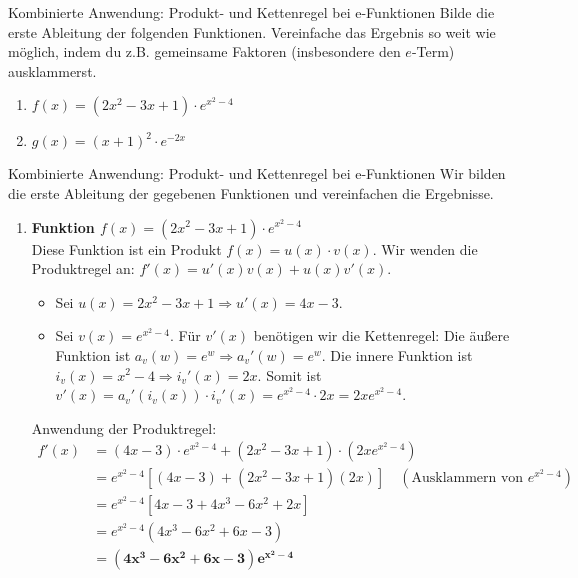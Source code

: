 \begin{aufgabenumgebung}{Kombinierte Anwendung: Produkt- und Kettenregel bei e-Funktionen}
Bilde die erste Ableitung der folgenden Funktionen. Vereinfache das Ergebnis so weit wie möglich, indem du z.B. gemeinsame Faktoren (insbesondere den $e$-Term) ausklammerst.
\begin{enumerate}
    \item $f(x) = (2x^2 - 3x + 1) \cdot e^{x^2 - 4}$
    \item $g(x) = (x+1)^2 \cdot e^{-2x}$
\end{enumerate}
\end{aufgabenumgebung}

\begin{loesungsumgebung}{Kombinierte Anwendung: Produkt- und Kettenregel bei e-Funktionen}
Wir bilden die erste Ableitung der gegebenen Funktionen und vereinfachen die Ergebnisse.

\begin{enumerate}[label=(\alph*)]
    \item \textbf{Funktion $f(x) = (2x^2 - 3x + 1) \cdot e^{x^2 - 4}$} \\
    Diese Funktion ist ein Produkt $f(x) = u(x) \cdot v(x)$. Wir wenden die Produktregel an: $f'(x) = u'(x)v(x) + u(x)v'(x)$.
    \begin{itemize}
        \item Sei $u(x) = 2x^2 - 3x + 1 \Rightarrow u'(x) = 4x - 3$.
        \item Sei $v(x) = e^{x^2 - 4}$. Für $v'(x)$ benötigen wir die Kettenregel:
        Die äußere Funktion ist $a_v(w) = e^w \Rightarrow a_v'(w) = e^w$.
        Die innere Funktion ist $i_v(x) = x^2 - 4 \Rightarrow i_v'(x) = 2x$.
        Somit ist $v'(x) = a_v'(i_v(x)) \cdot i_v'(x) = e^{x^2 - 4} \cdot 2x = 2xe^{x^2 - 4}$.
    \end{itemize}
    Anwendung der Produktregel:
    \begin{align*}
    f'(x) &= (4x - 3) \cdot e^{x^2 - 4} + (2x^2 - 3x + 1) \cdot (2xe^{x^2 - 4}) \\
          &= e^{x^2 - 4} \left[ (4x - 3) + (2x^2 - 3x + 1)(2x) \right] \quad (\text{Ausklammern von } e^{x^2-4}) \\
          &= e^{x^2 - 4} [4x - 3 + 4x^3 - 6x^2 + 2x] \\
          &= e^{x^2 - 4} (4x^3 - 6x^2 + 6x - 3) \\
          &= \mathbf{(4x^3 - 6x^2 + 6x - 3)e^{x^2 - 4}}
    \end{align*}


\end{enumerate}
\end{loesungsumgebung}
